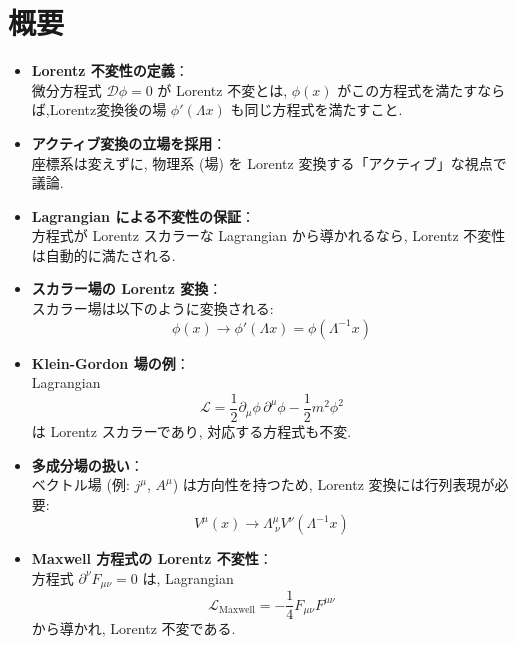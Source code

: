 \documentclass[a4paper,12pt]{article}
\begin{document}
\section*{概要}
\begin{itemize}
  \item \textbf{Lorentz 不変性の定義}：\\
  微分方程式 $\mathcal{D}\phi = 0$ が Lorentz 不変とは, $\phi(x)$ がこの方程式を満たすならば,Lorentz変換後の場 $\phi'(\Lambda x)$ も同じ方程式を満たすこと.

  \item \textbf{アクティブ変換の立場を採用}：\\
  座標系は変えずに, 物理系 (場) を Lorentz 変換する「アクティブ」な視点で議論.

  \item \textbf{ Lagrangian による不変性の保証}：\\
  方程式が Lorentz スカラーな Lagrangian から導かれるなら, Lorentz 不変性は自動的に満たされる.

  \item \textbf{スカラー場の Lorentz 変換}：\\
  スカラー場は以下のように変換される:
  \begin{equation*}
    \phi(x) \to \phi'(\Lambda x) = \phi(\Lambda^{-1}x)
  \end{equation*}

  \item \textbf{Klein-Gordon 場の例}：\\
  Lagrangian
  \begin{equation*}
    \mathcal{L} = \frac{1}{2} \partial_\mu \phi\, \partial^\mu \phi - \frac{1}{2} m^2 \phi^2
  \end{equation*}
  は Lorentz スカラーであり, 対応する方程式も不変.

  \item \textbf{多成分場の扱い}：\\
  ベクトル場 (例: $j^\mu$, $A^\mu$) は方向性を持つため, Lorentz 変換には行列表現が必要:
  \begin{equation*}
    V^\mu(x) \to \Lambda^\mu_{\ \nu} V^\nu(\Lambda^{-1}x)
  \end{equation*}

  \item \textbf{Maxwell 方程式の Lorentz 不変性}：\\
  方程式 $\partial^\nu F_{\mu\nu} = 0$ は, Lagrangian
  \begin{equation*}
    \mathcal{L}_\text{Maxwell} = -\frac{1}{4} F_{\mu\nu} F^{\mu\nu}
  \end{equation*}
  から導かれ, Lorentz 不変である.


\end{itemize}
\end{document}
